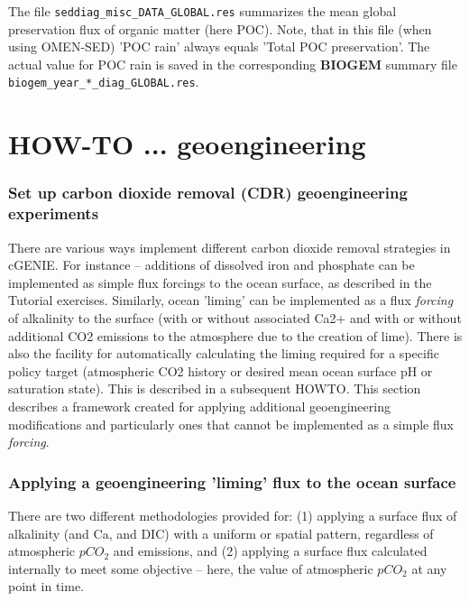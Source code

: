 \documentclass[11pt,fleqn]{book} %
\begin{document}
The file \texttt{seddiag\_misc\_DATA\_GLOBAL.res} summarizes the mean global preservation flux of organic matter (here POC). Note, that in this file (when using OMEN-SED) 'POC rain' always equals 'Total POC preservation'. The actual value for 
POC rain is saved in the corresponding \textbf{BIOGEM} summary file \texttt{biogem\_year\_*\_diag\_GLOBAL.res}.


\newpage


\section{HOW-TO ... geoengineering}

\subsubsection{Set up carbon dioxide removal (CDR) geoengineering experiments}

There are various ways implement different carbon dioxide removal strategies in cGENIE. For instance -- additions of dissolved iron and phosphate can be implemented as simple flux forcings to the ocean surface, as described in the Tutorial exercises. Similarly, ocean 'liming'
 can be implemented as a flux \textit{forcing} of alkalinity to the surface (with or without associated Ca2+ and with or without additional CO2 emissions to the atmosphere due to the creation of lime).
There is also the facility for automatically calculating the liming required for a specific policy target (atmospheric CO2 history or desired mean ocean surface pH or saturation state). This is described in a subsequent HOWTO.
This section describes a framework created for applying additional geoengineering modifications and particularly ones that cannot be implemented as a simple flux \textit{forcing}.

%
\subsubsection{Applying a geoengineering 'liming' flux to the ocean surface}
\vspace{1mm}

There are two different methodologies provided for: (1) applying a surface flux of alkalinity (and Ca, and DIC) with a uniform or spatial pattern, regardless of atmospheric \(pCO_{2}\) and emissions, and (2) applying a surface flux calculated internally to meet some objective -- here, the value of atmospheric \(pCO_{2}\) at any point in time.
\end{document}
